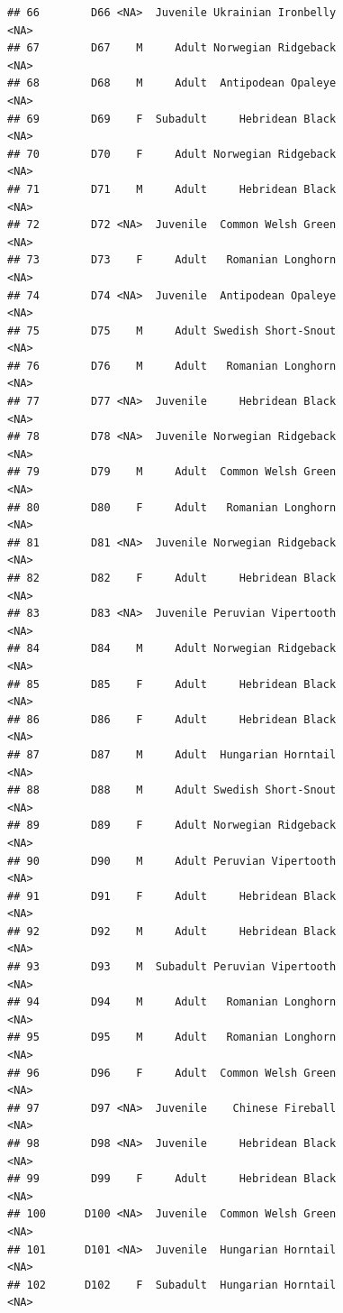 \documentclass[
]{book}
\begin{document}
\begin{verbatim}
## 66        D66 <NA>  Juvenile Ukrainian Ironbelly                <NA>
## 67        D67    M     Adult Norwegian Ridgeback                <NA>
## 68        D68    M     Adult  Antipodean Opaleye                <NA>
## 69        D69    F  Subadult     Hebridean Black                <NA>
## 70        D70    F     Adult Norwegian Ridgeback                <NA>
## 71        D71    M     Adult     Hebridean Black                <NA>
## 72        D72 <NA>  Juvenile  Common Welsh Green                <NA>
## 73        D73    F     Adult   Romanian Longhorn                <NA>
## 74        D74 <NA>  Juvenile  Antipodean Opaleye                <NA>
## 75        D75    M     Adult Swedish Short-Snout                <NA>
## 76        D76    M     Adult   Romanian Longhorn                <NA>
## 77        D77 <NA>  Juvenile     Hebridean Black                <NA>
## 78        D78 <NA>  Juvenile Norwegian Ridgeback                <NA>
## 79        D79    M     Adult  Common Welsh Green                <NA>
## 80        D80    F     Adult   Romanian Longhorn                <NA>
## 81        D81 <NA>  Juvenile Norwegian Ridgeback                <NA>
## 82        D82    F     Adult     Hebridean Black                <NA>
## 83        D83 <NA>  Juvenile Peruvian Vipertooth                <NA>
## 84        D84    M     Adult Norwegian Ridgeback                <NA>
## 85        D85    F     Adult     Hebridean Black                <NA>
## 86        D86    F     Adult     Hebridean Black                <NA>
## 87        D87    M     Adult  Hungarian Horntail                <NA>
## 88        D88    M     Adult Swedish Short-Snout                <NA>
## 89        D89    F     Adult Norwegian Ridgeback                <NA>
## 90        D90    M     Adult Peruvian Vipertooth                <NA>
## 91        D91    F     Adult     Hebridean Black                <NA>
## 92        D92    M     Adult     Hebridean Black                <NA>
## 93        D93    M  Subadult Peruvian Vipertooth                <NA>
## 94        D94    M     Adult   Romanian Longhorn                <NA>
## 95        D95    M     Adult   Romanian Longhorn                <NA>
## 96        D96    F     Adult  Common Welsh Green                <NA>
## 97        D97 <NA>  Juvenile    Chinese Fireball                <NA>
## 98        D98 <NA>  Juvenile     Hebridean Black                <NA>
## 99        D99    F     Adult     Hebridean Black                <NA>
## 100      D100 <NA>  Juvenile  Common Welsh Green                <NA>
## 101      D101 <NA>  Juvenile  Hungarian Horntail                <NA>
## 102      D102    F  Subadult  Hungarian Horntail                <NA>

\end{verbatim}
\end{document}
